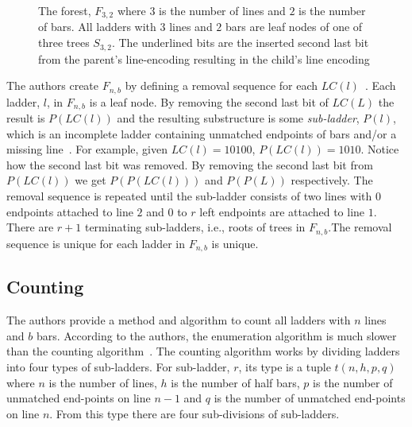 \begin{figure}[h]
\begin{center}
\begin{minipage}{0.8\textwidth}
        \end{minipage}
    \end{center}
    \caption{The forest, $F_{3,2}$ where $3$ is the number of lines and $2$ is the number of bars. All ladders with $3$ lines and $2$ bars are leaf nodes of one of three trees $S_{3,2}$.
    The underlined bits are the inserted second last bit from the parent's line-encoding resulting in the child's line encoding}
    \label{fig:forest3,2}
\end{figure}


The authors create $F_{n,b}$ by defining a removal sequence for 
each $LC(l)$~\cite{A6}. Each ladder, $l$, in 
$F_{n,b}$ is a leaf node. By removing the second last bit of $LC(L)$ the result 
is $P(LC(l))$ and the resulting substructure is some \emph{sub-ladder}, $P(l)$, which 
is an incomplete ladder containing unmatched endpoints of bars and/or a missing line~\cite{A6}. For example, 
given $LC(l)=10100$, $P(LC(l))=1010$. Notice how the second last bit was removed. 
By removing the second last bit from $P(LC(l))$ we get $P(P(LC(l)))$ and $P(P(L))$ respectively.
The removal sequence is repeated until the sub-ladder consists of two lines with $0$ endpoints
attached to line $2$ and $0$ to $r$ left endpoints are attached to line $1$. There are $r+1$
terminating sub-ladders, i.e., roots of trees in $F_{n,b}$.The removal sequence is unique for each ladder in $F_{n,b}$ is unique.\par


\subsection{Counting}
The authors provide a method and algorithm to count all ladders 
with $n$ lines and $b$ bars. According to the authors, the enumeration algorithm is 
much slower than the counting algorithm~\cite{A6}. The counting algorithm 
works by dividing ladders into four types of sub-ladders.
For sub-ladder, $r$, its type is a tuple $t(n,h,p,q)$ where 
$n$ is the number of lines, $h$ is the number of half bars, 
$p$ is the number of unmatched end-points on line $n-1$ and 
$q$ is the number of unmatched end-points on line $n$. From this 
type there are four sub-divisions of sub-ladders.\cite{A6}
